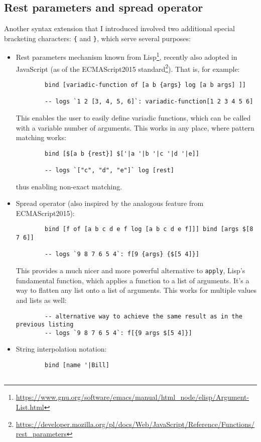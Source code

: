\subsection{Rest parameters and spread operator}\label{sub:rest}
Another syntax extension that I introduced involved two additional special
bracketing characters: \texttt{\{} and \texttt{\}}, which serve several
purposes:
\begin{itemize}
    \item Rest parameters mechanism known from
      Lisp\footnote{\url{https://www.gnu.org/software/emacs/manual/html_node/elisp/Argument-List.html}},
      recently also adopted in JavaScript (as of the ECMAScript2015
      standard\footnote{\url{https://developer.mozilla.org/pl/docs/Web/JavaScript/Reference/Functions/rest_parameters}}). That
      is, for example:
    \begin{lstlisting}
        bind [variadic-function of [a b {args} log [a b args] ]]
        
        -- logs `1 2 [3, 4, 5, 6]`: variadic-function[1 2 3 4 5 6]
    \end{lstlisting}
    This enables the user to easily define variadic functions, which can be
    called with a variable number of arguments.  This works in any place, where
    pattern matching works:
    \begin{lstlisting}
        bind [$[a b {rest}] $['|a '|b '|c '|d '|e]]
        
        -- logs `["c", "d", "e"]` log [rest]
    \end{lstlisting}
    
    thus enabling non-exact matching.
    
    \item Spread operator (also inspired by the analogous feature from
      ECMAScript2015):
    \begin{lstlisting}
        bind [f of [a b c d e f log [a b c d e f]]] bind [args $[8 7 6]]
        
        -- logs `9 8 7 6 5 4`: f[9 {args} {$[5 4]}]
    \end{lstlisting}
    This provides a much nicer and more powerful alternative to \texttt{apply},
    Lisp's fundamental function, which applies a function to a list of
    arguments. It's a way to flatten any list onto a list of arguments. This
    works for multiple values and lists as well:
    \begin{lstlisting}
        -- alternative way to achieve the same result as in the previous listing
        -- logs `9 8 7 6 5 4`: f[{9 args $[5 4]}]
    \end{lstlisting}
    \item String interpolation notation:
    \begin{lstlisting}
        bind [name '|Bill]
        

\end{lstlisting}
\end{itemize}
